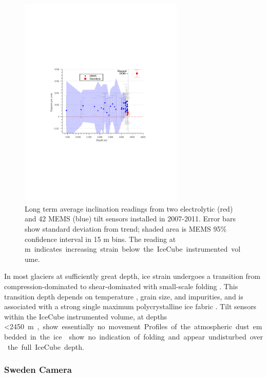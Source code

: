 \begin{figure}[!ht]
	\centering
    \includegraphics[width=0.7\textwidth]{graphics/geometry/tilt4.pdf}
	\caption{Long term average inclination readings from two electrolytic
      (red) and 42 MEMS (blue) tilt sensors installed in 2007-2011.  Error
      bars show standard deviation from trend; shaded area is MEMS 95\%
      confidence interval in 15 m bins.  The reading at \unit[2540]m
      indicates increasing strain below the IceCube instrumented volume.}
	\label{fig:tilt}
\end{figure}

In most glaciers at sufficiently great depth, ice strain undergoes a
transition from compression-dominated to shear-dominated with small-scale
folding \cite{montagnat14,jansen16}.  This transition depth depends on
temperature \cite{price2002temperature}, grain size, and impurities, and is
associated with a strong single maximum polycrystalline ice fabric
\cite{cuffey10}.  Tilt sensors within the IceCube instrumented volume, at
depths \SI{<2450}m, show essentially no movement.  Profiles of the
atmospheric dust embedded in the ice \cite{I3:dustlogger} show no
indication of folding and appear undisturbed over the full IceCube depth.

\subsubsection{Sweden Camera}

